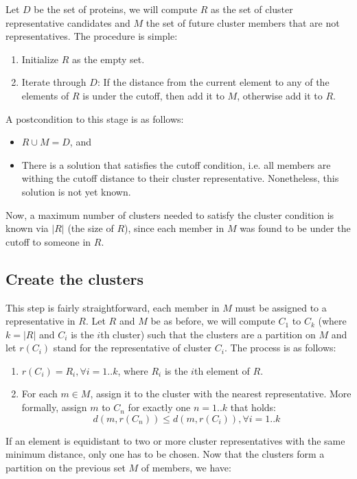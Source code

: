 \documentclass[a4paper,12pt,english]{report}
\begin{document}
Let $D$ be the set of proteins, we will compute $R$ as the set of cluster representative candidates and $M$ the set of future cluster members that are not representatives. The procedure is simple:
\begin{enumerate}
\item Initialize $R$ as the empty set.
\item Iterate through $D$: If the distance from the current element to any of the elements of $R$ is under the cutoff, then add it to $M$, otherwise add it to $R$.
\end{enumerate}

A postcondition to this stage is as follows:
\begin{itemize}
 \item $R \cup M = D$, and
 \item There is a solution that satisfies the cutoff condition, i.e. all members are withing the cutoff distance to their cluster representative. Nonetheless, this solution is not yet known.
\end{itemize}

Now, a maximum number of clusters needed to satisfy the cluster condition is known via $\vert R \vert$ (the size of $R$), since each member in $M$ was found to be under the cutoff to someone in $R$.

\subsection{Create the clusters}

This step is fairly straightforward, each member in $M$ must be assigned to a representative in $R$. Let $R$ and $M$ be as before, we will compute $C_1$ to $C_k$ (where $k=\vert R \vert$ and $C_i$ is the $i$th cluster) such that the clusters are a partition on $M$ and let $r(C_i)$ stand for the representative of cluster $C_i$. The process is as follows:
\begin{enumerate}
 \item $r(C_i) = R_i, \forall i = 1..k$, where $R_i$ is the $i$th element of $R$.
 \item For each $m \in M$, assign it to the cluster with the nearest representative. More formally, assign $m$ to $C_n$ for exactly one $n = 1..k$ that holds:
 $$d(m,r(C_n)) \leq d(m,r(C_i)), \forall i = 1..k$$
\end{enumerate}

If an element is equidistant to two or more cluster representatives with the same minimum distance, only one has to be chosen. Now that the clusters form a partition on the previous set $M$ of members, we have:
\end{document}
